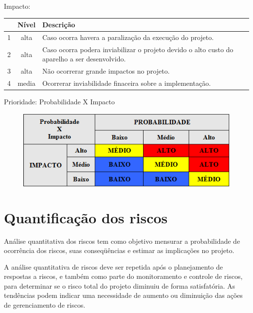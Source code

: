 Impacto:
\begin{table}[h]
\centering
\begin{tabular}{|c|c|p{13.3cm}|}

  & Nível & Descrição\\
\hline                               
1 & alta & Caso ocorra havera a paralização da execução do projeto. \\
\hline
2 & alta & Caso ocorra podera inviabilizar o projeto devido o alto custo do aparelho a ser desenvolvido.\\
\hline
3 & alta & Não ocorrerar grande impactos no projeto.\\
\hline
4 & media & Ocorrerar inviabilidade finaceira sobre a implementação. \\
\hline
\end{tabular}
\end{table}

Prioridade: Probabilidade X Impacto
\begin{figure}[h]
\begin{center}

\includegraphics[scale=0.65]{editaveis/figuras/prioridade}
\label{Prioridade}
\end{center}
\end{figure}
\FloatBarrier

\section{Quantificação dos riscos}
Análise quantitativa dos riscos tem como objetivo mensurar a probabilidade de ocorrência dos riscos, suas conseqüências e estimar as implicações no projeto.

A análise quantitativa de riscos deve ser repetida após o planejamento de respostas a riscos, e também como parte do monitoramento e controle de riscos, para determinar se o risco total do projeto diminuiu de forma satisfatória. As tendências podem indicar uma necessidade de aumento ou diminuição das ações de gerenciamento de riscos.

